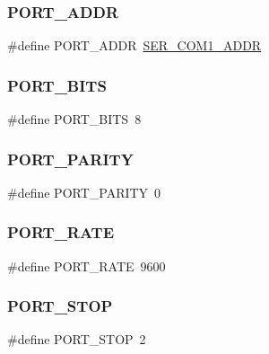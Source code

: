 \subsubsection{\texorpdfstring{P\+O\+R\+T\+\_\+\+A\+D\+DR}{PORT\_ADDR}}
{\footnotesize\ttfamily \#define P\+O\+R\+T\+\_\+\+A\+D\+DR~\hyperlink{group__ser__port_ga98199cd85fbe47b9a741b07762260422}{S\+E\+R\+\_\+\+C\+O\+M1\+\_\+\+A\+D\+DR}}

\hypertarget{group__proj_ga108355009766d90bac37c294fad39ca5}{}\label{group__proj_ga108355009766d90bac37c294fad39ca5} 
\subsubsection{\texorpdfstring{P\+O\+R\+T\+\_\+\+B\+I\+TS}{PORT\_BITS}}
{\footnotesize\ttfamily \#define P\+O\+R\+T\+\_\+\+B\+I\+TS~8}

\hypertarget{group__proj_gaf868e5bf4fd27a5f53de530ce879dee4}{}\label{group__proj_gaf868e5bf4fd27a5f53de530ce879dee4} 
\subsubsection{\texorpdfstring{P\+O\+R\+T\+\_\+\+P\+A\+R\+I\+TY}{PORT\_PARITY}}
{\footnotesize\ttfamily \#define P\+O\+R\+T\+\_\+\+P\+A\+R\+I\+TY~0}

\hypertarget{group__proj_gaa892a49ac9cab99bd99907f48a535b72}{}\label{group__proj_gaa892a49ac9cab99bd99907f48a535b72} 
\subsubsection{\texorpdfstring{P\+O\+R\+T\+\_\+\+R\+A\+TE}{PORT\_RATE}}
{\footnotesize\ttfamily \#define P\+O\+R\+T\+\_\+\+R\+A\+TE~9600}

\hypertarget{group__proj_ga31b06d45be51d1c232d4cb34be4d385b}{}\label{group__proj_ga31b06d45be51d1c232d4cb34be4d385b} 
\subsubsection{\texorpdfstring{P\+O\+R\+T\+\_\+\+S\+T\+OP}{PORT\_STOP}}
{\footnotesize\ttfamily \#define P\+O\+R\+T\+\_\+\+S\+T\+OP~2}



